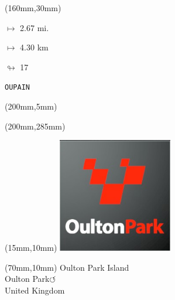 \begin{textblock*}{40mm}(160mm,30mm)%
\Large
\par$\mapsto$ 2.67 mi.
\par$\mapsto$ 4.30 km
\par$\looparrowright$ 17
\par\hfill\tiny\tt OUPAIN\\
\end{textblock*}
\begin{textblock*}{20mm}(200mm,5mm)%
\fbox{\thepage}
\label{OUPAIN}
\end{textblock*}
\begin{textblock*}{20mm}(200mm,285mm)%
\fbox{\thepage}
\end{textblock*}

\null\newpage
\begin{textblock*}{50mm}(15mm,10mm)%
\includegraphics[width=50mm]{LG/2015-05-20_00091.png}
\end{textblock*}
\begin{textblock*}{130mm}(70mm,10mm)%
{\fontsize{20}{20}\selectfont Oulton Park Island\\}
{\fontsize{16}{16}\selectfont Oulton Park\hfill \huge$\circlearrowleft$\\}
{\fontsize{12}{12}\selectfont United Kingdom\\}
\end{textblock*}
